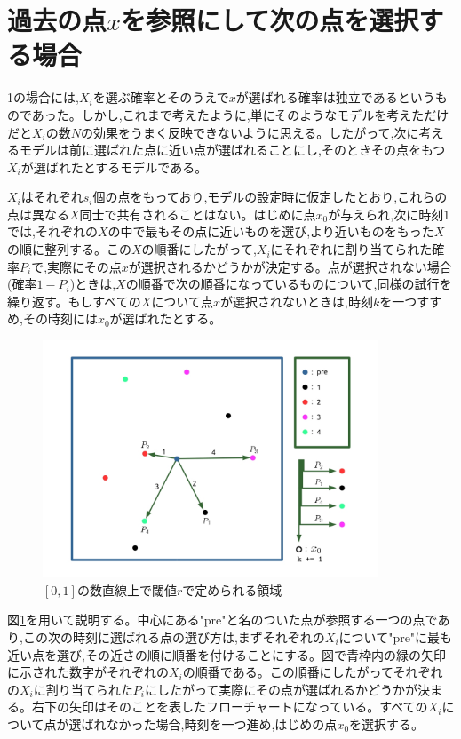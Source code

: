 \section{過去の点$x$を参照にして次の点を選択する場合}

1の場合には,$X_{i}$を選ぶ確率とそのうえで$x$が選ばれる確率は独立であるというものであった。しかし,これまで考えたように,単にそのようなモデルを考えただけだと$X_{i}$の数$N$の効果をうまく反映できないように思える。したがって,次に考えるモデルは前に選ばれた点に近い点が選ばれることにし,そのときその点をもつ$X_{i}$が選ばれたとするモデルである。

$X_{i}$はそれぞれ$s_{i}$個の点をもっており,モデルの設定時に仮定したとおり,これらの点は異なる$X$同士で共有されることはない。はじめに点$x_{0}$が与えられ,次に時刻$1$では,それぞれの$X$の中で最もその点に近いものを選び,より近いものをもった$X$の順に整列する。この$X$の順番にしたがって,$X_{i}$にそれぞれに割り当てられた確率$P_{i}$で,実際にその点$x$が選択されるかどうかが決定する。点が選択されない場合(確率$1-P_{i}$)ときは,$X$の順番で次の順番になっているものについて,同様の試行を繰り返す。もしすべての$X$について点$x$が選択されないときは,時刻$k$を一つすすめ,その時刻には$x_{0}$が選ばれたとする。
\begin{figure}[H]
    \begin{center}
        \includegraphics[width=10cm]{../img/figure2.jpg}
        \caption{$[0,1]$の数直線上で閾値$r$で定められる領域}
        \label{fig:f8}
    \end{center}
\end{figure}

図\ref{fig:f8}を用いて説明する。中心にある"pre"と名のついた点が参照する一つの点であり,この次の時刻に選ばれる点の選び方は,まずそれぞれの$X_{i}$について"pre"に最も近い点を選び,その近さの順に順番を付けることにする。図で青枠内の緑の矢印に示された数字がそれぞれの$X_{i}$の順番である。この順番にしたがってそれぞれの$X_{i}$に割り当てられた$P_{i}$にしたがって実際にその点が選ばれるかどうかが決まる。右下の矢印はそのことを表したフローチャートになっている。すべての$X_{i}$について点が選ばれなかった場合,時刻を一つ進め,はじめの点$x_{0}$を選択する。

